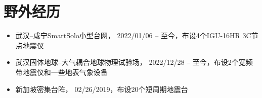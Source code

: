 \section{野外经历}

\begin{itemize}
\item 武汉--咸宁SmartSolo小型台网，
      2022/01/06 -- 至今，布设4个IGU-16HR 3C节点地震仪
\item 武汉固体地球--大气耦合地球物理试验场，
      2022/12/28 -- 至今，布设2个宽频带地震仪和一些地表气象设备
\item 新加坡密集台阵，
      02/26/2019，布设20个短周期地震台
\end{itemize}
